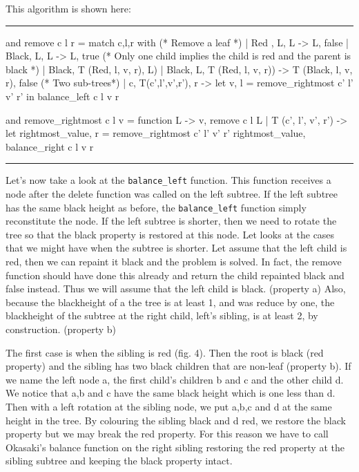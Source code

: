 \documentclass[10pt,a4paper]{article}
\newcommand{\code}{\texttt}
\newenvironment{codeblock}%
{\center \minipage{\textwidth} \vspace{6pt} \hrule \vspace{6pt} \minted{ocaml}}%
{\endminted \hrule \vspace{6pt} \endminipage \endcenter}
\begin{document}
This algorithm is shown here:
\begin{codeblock}
  and remove c l r = match c,l,r with
    (* Remove a leaf *)
    | Red  , L, L -> L, false
    | Black, L, L -> L, true
    (* Only one child implies the child is red and the parent is black *)
    | Black, T (Red, l, v, r), L)
    | Black, L, T (Red, l, v, r)) -> T (Black, l, v, r), false
    (* Two sub-trees*)
    | c, T(c',l',v',r'), r ->
      let v, l = remove_rightmost c' l' v' r' in
           balance_left c l v r

  and remove_rightmost c l v = function
      L -> v, remove c l L
    | T (c', l', v', r') ->
      let rightmost_value, r = remove_rightmost c' l' v' r'
      rightmost_value, balance_right c l v r
\end{codeblock}

Let's now take a look at the \code{balance_left} function. This function receives a node after the delete function was called on the left subtree.
If the left subtree has the same black height as before, the \code{balance_left} function simply reconstitute the node. If the left subtree is shorter, then we need to rotate the tree so that the black property is restored at this node.
Let looks at the cases that we might have when the subtree is shorter.
Let assume that the left child is red, then we can repaint it black and the problem is solved. In fact, the remove function should have done this already and return the child repainted black and false instead.
Thus we will assume that the left child is black. (property a)
Also, because the blackheight of a the tree is at least 1, and was reduce by one, the blackheight of the subtree at the right child, left's sibling, is at least 2, by construction. (property b)

The first case is when the sibling is red (fig. 4). Then the root is black (red property) and the sibling has two black children that are non-leaf (property b). If we name the left node a, the first child's children b and c and the other child d. We notice that a,b and c have the same black height which is one less than d. Then with a left rotation at the sibling node, we put a,b,c and d at the same height in the tree. By colouring the sibling black and d red, we restore the black property but we may break the red property. For this reason we have to call Okasaki's balance function on the right sibling restoring the red property at the sibling subtree and keeping the black property intact.
\end{document}
